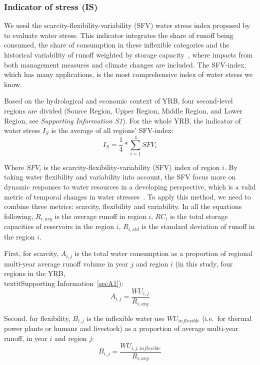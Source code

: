 \documentclass[draft]{../agujournal2019}
\begin{document}
	\subsubsection{Indicator of stress (IS)}
	We used the scarcity-flexibility-variability (SFV) water stress index proposed by  to evaluate water stress.
	This indicator integrates the share of runoff being consumed, the share of consumption in these inflexible categories and the historical variability of runoff weighted by storage capacity~\cite{qin2019}, where impacts from both management measures and climate changes are included.
The SFV-index, which has many applications, is the most comprehensive index of water stress we know.

	Based on the hydrological and economic context of YRB, four second-level regions are divided (Source Region, Upper Region, Middle Region, and Lower Region, see \textit{Supporting Information S1}).
	For the whole YRB, the indicator of water stress $I_S$ is the average of all regions' SFV-index:
	\begin{equation}
		I_S = \frac{1}{4} * \sum_{i=1}^4 SFV_{i}
	\end{equation}

	Where $SFV_i$ is the scarcity-flexibility-variability (SFV) index of region $i$. By taking water flexibility and variability into account, the SFV focus more on dynamic responses to water resources in a developing perspective, which is a valid metric of temporal changes in water stresses~\cite{qin2019}. To apply this method, we need to combine three metrics: scarcity, flexibility and variability.
	In all the equations following, $R_{i, avg}$ is the average runoff in region $i$, $RC_i$ is the total storage capacities of reservoirs in the region $i$, $R_{i, std}$ is the standard deviation of runoff in the region $i$.

	First, for scarcity, $A_{i, j}$ is the total water consumption as a proportion of regional multi-year average runoff volume in year $j$ and region $i$ (in this study, four regions in the YRB, \\textit{Supporting Information}~\ref{secA1}):
	\begin{equation}
		A_{i, j} = \frac{WU_{i,j}}{R_{i, avg}}
	\end{equation}

	Second, for flexibility, $B_{i, j}$ is the inflexible water use $WU_{inflexible}$ (i.e.\ for thermal power plants or humans and livestock) as a proportion of average multi-year runoff, in year $i$ and region $j$:
	\begin{equation}
		B_{i, j} = \frac{WU_{i, j, inflexible}}{R_{i, avg}}
	\end{equation}
\end{document}
